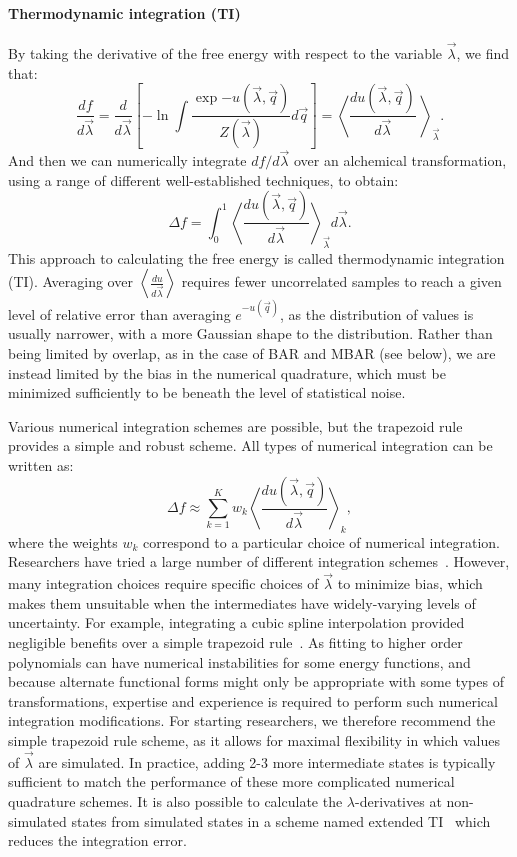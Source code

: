 \documentclass[9pt,bestpractices]{livecoms}
\newcommand{\expect}[1]{\left\langle{#1}\right\rangle}
\begin{document}
\paragraph{Thermodynamic integration (TI)}
By taking the derivative of the free energy with respect to the
variable $\vec{\lambda}$, we find that:
\begin{equation}
\frac{df}{d\vec{\lambda}} = \frac{d}{d\vec{\lambda}} \left[-\ln \int \frac{\exp{-u(\vec{\lambda},\vec{q})}}{Z(\vec{\lambda})} d\vec{q}\right] = \expect{\frac{du(\vec{\lambda},\vec{q})}{d\vec{\lambda}}\
}_{\vec{\lambda}} .
\end{equation}
And then we can numerically integrate $df/d\vec{\lambda}$ over an alchemical transformation, using a range of different well-established techniques, to obtain:
\begin{equation}
\Delta f    = \int_{0}^{1} \expect{\frac{du(\vec{\lambda},\vec{q})}{d\vec{\lambda}}}_{\vec{\lambda}}  d\vec{\lambda}.    
\end{equation}
This approach to calculating the free energy is called thermodynamic integration (TI). Averaging over $\expect{\frac{du}{d\vec{\lambda}}}$ requires fewer uncorrelated samples to reach a given level of relative error
than averaging $e^{-u(\vec{q})}$, as the distribution of values is usually narrower, with a more Gaussian shape to the distribution. Rather than being limited by overlap, as in the case of BAR and MBAR (see below), we are instead limited by the bias in the numerical quadrature, which must be minimized sufficiently to be beneath the level of statistical noise.

Various numerical integration schemes are possible, but the trapezoid
rule provides a simple and robust scheme. All types of numerical integration can be written as:
\[ \Delta f \approx \sum_{k=1}^{K} w_k
\expect{\frac{du(\vec{\lambda},\vec{q})}{d\vec{\lambda}}}_{k}, \] where the weights $w_k$ correspond to a particular choice of numerical integration.
Researchers have tried a large number of different integration schemes~\cite{resat1993studies,jorge2010effect,shyu2009reducing}. However, many integration choices require specific choices of $\vec{\lambda}$ to minimize bias, which makes them unsuitable when the intermediates
have widely-varying levels of uncertainty. For example, integrating a cubic spline interpolation provided negligible benefits over a simple trapezoid rule~\cite{paliwal2011benchmark}. As fitting to higher order polynomials can have numerical instabilities for some energy functions, and because alternate functional forms might only be appropriate with some types of transformations, expertise and experience is required to perform such numerical integration modifications. For starting researchers, we therefore recommend the simple trapezoid rule scheme, as it allows for maximal flexibility in which values of $\vec{\lambda}$ are simulated. In practice, adding 2-3 more intermediate states is typically sufficient to match the performance of these more complicated numerical quadrature schemes. It is also possible to calculate the $\lambda$-derivatives at non-simulated states from simulated states in a scheme named extended TI~\cite{ruiter2016extended} which reduces the integration error.
\end{document}
